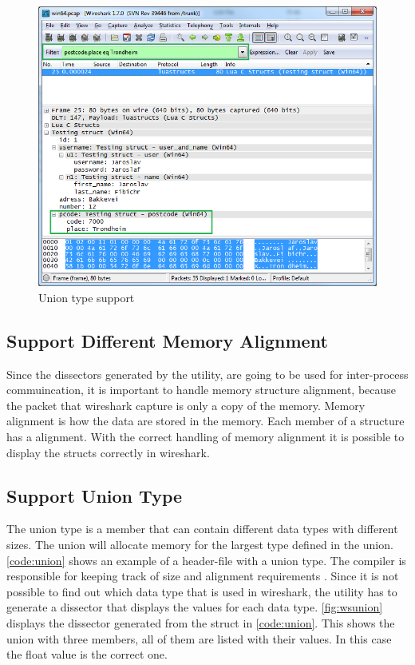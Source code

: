 \begin{figure}[ht]
	\center
	\includegraphics[width=\textwidth]{./sprints/img/wireshark_filter}
	\caption{Union type support\label{fig:wsfilter}}
\end{figure}

\subsection{Support Different Memory Alignment}
Since the \glspl{dissector} generated by the \gls{utility}, are going to be used for 
inter-process commuincation, it is important to handle memory structure 
alignment, because the \gls{packet} that \Gls{wireshark} capture is only a copy of the 
memory. Memory alignment is how the data are stored in the memory. Each \gls{member} 
of a structure has a alignment. With the correct handling of memory alignment it is 
possible to display the \glspl{struct} correctly in \Gls{wireshark}.

\subsection{Support Union Type}
The \gls{union} type is a \gls{member} that can contain different data types with 
different sizes. The \gls{union} will allocate memory for the largest type defined 
in the \gls{union}. \autoref{code:union} shows an example of a \gls{header}-file with a 
\gls{union} type. The compiler is responsible for keeping track of size and 
alignment requirements\cite[p.147]{Kerninghan1988} . Since it is not 
possible to find out which data type that is used in \Gls{wireshark}, the \gls{utility} 
has to generate a \gls{dissector} that displays the values for each data type. 
\autoref{fig:wsunion} displays the \gls{dissector} generated from the \gls{struct} in 
\autoref{code:union}. This shows the \gls{union} with three \glspl{member}, all of them are 
listed with their values. In this case the \gls{float} value is the correct one.

